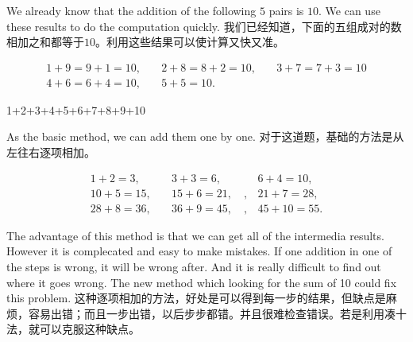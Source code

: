 \begin{paracol}{2}
We already know that the addition of the following $5$ pairs is $10$. We can use these results to do the computation quickly. 
\switchcolumn[1]
我们已经知道，下面的五组成对的数相加之和都等于$10$。利用这些结果可以使计算又快又准。
\end{paracol}
$$
\begin{aligned}
1+9=9+1=10,\quad & 2+8=8+2=10,\quad & 3+7=7+3=10\\
4+6=6+4=10,\quad & 5+5=10.
\end{aligned}
$$
\begin{example}
1+2+3+4+5+6+7+8+9+10
\end{example}
\begin{solution}
\begin{paracol}{2}
As the basic method, we can add them one by one.
\switchcolumn[1]
对于这道题，基础的方法是从左往右逐项相加。
\end{paracol}
$$
\begin{aligned}
1+2=3,\quad & 3+3=6,\quad & 6+4=10,\\
10+5=15,\quad & 15+6=21,\quad, & 21+7 = 28,\\
28+8=36,\quad & 36+9=45,\quad,& 45+10 = 55.
\end{aligned}
$$
\begin{paracol}{2}
The advantage of this method is that we can get all of the intermedia results. However it is complecated and easy to make mistakes. If one addition in one of the steps is wrong, it will be wrong after. And it is really difficult to find out where it goes wrong. The new method which looking for the sum of 10 could fix this problem.
\switchcolumn[1]
这种逐项相加的方法，好处是可以得到每一步的结果，但缺点是麻烦，容易出错；而且一步出错，以后步步都错。并且很难检查错误。若是利用凑十法，就可以克服这种缺点。
\end{paracol}

\begin{center}
\end{center}
\end{solution}

